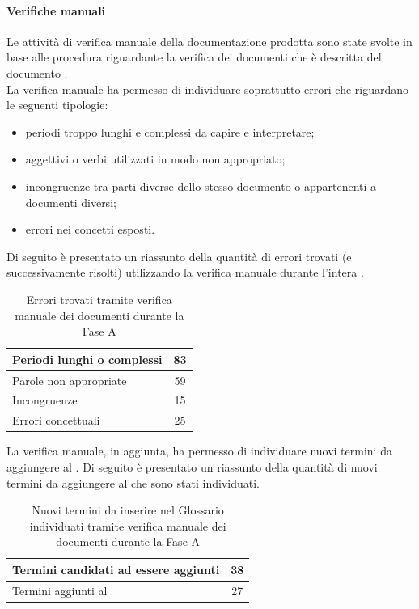 			\paragraph{Verifiche manuali}
				Le attività di verifica manuale della documentazione prodotta sono state svolte in base alle procedura riguardante la verifica dei 
				documenti che è descritta del documento .\\
				La verifica manuale ha permesso di individuare soprattutto errori che riguardano le seguenti tipologie:
				\begin{itemize}
					\item periodi troppo lunghi e complessi da capire e interpretare;
					\item aggettivi o verbi utilizzati in modo non appropriato;
					\item incongruenze tra parti diverse dello stesso documento o appartenenti a documenti diversi;
					\item errori nei concetti esposti.
				\end{itemize}
				Di seguito è presentato un riassunto della quantità di errori trovati (e successivamente risolti) utilizzando la verifica manuale durante 
				l'intera .
				\begin{table}[H]
					\centering
					\begin{tabu}{| l | c |}
						\hline
						Periodi lunghi o complessi	&83	\\ \hline
						Parole non appropriate	&59	\\ \hline
						Incongruenze	&15	\\ \hline
						Errori concettuali	&25	\\ \hline
					\end{tabu}
					\caption{Errori trovati tramite verifica manuale dei documenti durante la Fase A}
				\end{table}
				La verifica manuale, in aggiunta, ha permesso di individuare nuovi termini da aggiungere al . Di seguito è presentato un 
				riassunto della quantità di nuovi termini da aggiungere al  che sono stati individuati.
				\begin{table}[H]
					\centering
					\begin{tabu}{| l | c |}
						\hline
						Termini candidati ad essere aggiunti	&38	\\ \hline
						Termini aggiunti al \insdoc{Glossario}	&27	\\ \hline
					\end{tabu}
					\caption{Nuovi termini da inserire nel Glossario individuati tramite verifica manuale dei documenti durante la Fase A}
				\end{table}
